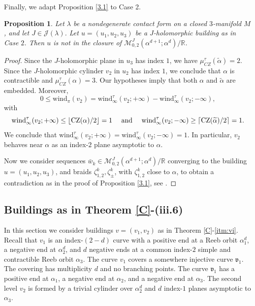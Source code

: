 \documentclass{amsart}
\newcommand{\R}{\mathbb{R}}
\newcommand{\M}{\mathcal{M}}
\newcommand{\cz}{{\rm CZ}}
\newtheorem{prop}[theorem]{Proposition}
\newcommand{\CZ}{\mu_{CZ}^{\tau}}
\newcommand{\wind}{\text{wind}^{\tau}}
\begin{document}
Finally, we adapt Proposition \ref{3.1} to Case 2.

\begin{prop} \label{naopode2} 
Let $\lambda$ be a nondegenerate contact form on a closed $3$-manifold $M$,  and let $J \in \mathcal{J}(\lambda)$. Let $u=(u_1,u_2,u_3)$ be a $J$-holomorphic building as in Case $2$. Then $u$ is not in the closure of $\M_{0,2}^J(\alpha^{d+1};\alpha^d)/\R$.
\end{prop}

\begin{proof}
Since the $J$-holomorphic plane in $u_3$ has index $1$, we have $\CZ(\widetilde{\alpha})=2$. Since the $J$-holomorphic cylinder $v_2$ in $u_2$ has index $1$, we conclude that $\alpha$ is contractible and $\CZ(\alpha)=3$. Our hypotheses imply that both $\alpha$ and $\widetilde \alpha$ are embedded. Moreover, $$0\leq \text{wind}_\pi(v_2)=\wind_\infty(v_2;+\infty)-\wind_\infty(v_2;-\infty),$$ with $$\wind_\infty(v_2;+\infty)\leq \lfloor\cz(\alpha)/2\rfloor=1 \quad \mbox{ and } \quad \wind_\infty(v_2;-\infty)\geq  \lceil \cz(\widetilde \alpha)/2\rceil = 1.$$ We conclude that $\wind_\infty(v_2;+\infty)=\wind_\infty(v_2;-\infty)=1$. In particular, $v_2$ behaves near $\alpha$ as an index-$2$ plane asymptotic to $\alpha$. 

Now we consider sequences $\bar{w}_k \in \M_{0,2}^J(\alpha^{d+1};\alpha^d)/\R$ converging to the building $u= (u_1,u_2,u_3)$, and braids $\zeta_{1,2}^k, \zeta^k_\pm$, with $\zeta^k_{1,2}$ close to $\alpha$, to obtain a contradiction as in the proof of Proposition \ref{3.1}, see \cite[Proposition 3.1]{HN}.
\end{proof}


\subsection{Buildings as in Theorem \ref{C}-(iii.6)}

In this section we consider buildings $v=(v_1,v_2)$ as in Theorem \ref{C}-\ref{itm:vi}. Recall that $v_1$ is an index-$(2-d)$ curve with a positive end at a Reeb orbit $\alpha_1^d$, a negative end at $\alpha_2^d$, and $d$ negative ends at a common index-$2$ simple and contractible Reeb orbit $\alpha_3$. The curve $v_1$ covers a somewhere injective curve $\mathfrak{v}_1$. The covering has multiplicity $d$ and no branching points. The curve $\mathfrak{v}_1$ has a positive end at $\alpha_1$, a negative end at $\alpha_2$, and a negative end at $\alpha_3$. The second level $v_2$ is formed by a trivial cylinder over $\alpha_2^d$ and $d$ index-$1$ planes asymptotic to $\alpha_3$. 
\end{document}
